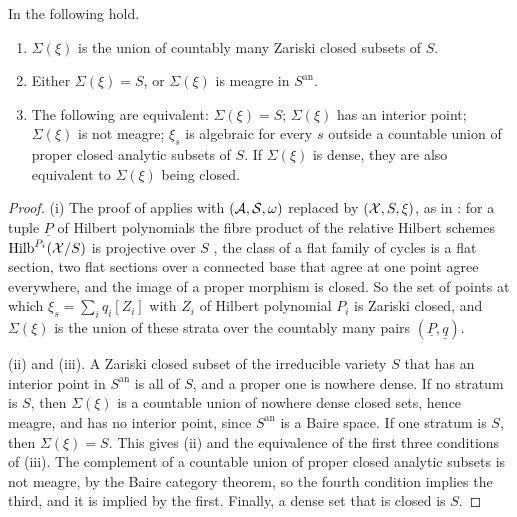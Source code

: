 \begin{lemma}\label{lem:algstrata}
In  the following hold.
\begin{enumerate}[label=\textup{(\roman*)},leftmargin=2.6em,itemsep=2pt]
\item $\Sigma(\xi)$ is the union of countably many Zariski closed subsets of
  $S$.
\item Either $\Sigma(\xi)=S$, or $\Sigma(\xi)$ is meagre in $S^{\mathrm{an}}$.
\item The following are equivalent: $\Sigma(\xi)=S$; $\Sigma(\xi)$ has an
  interior point; $\Sigma(\xi)$ is not meagre; $\xi_{s}$ is algebraic for
  every $s$ outside a countable union of proper closed analytic subsets of
  $S$. If $\Sigma(\xi)$ is dense, they are also equivalent to $\Sigma(\xi)$
  being closed.
\end{enumerate}
\end{lemma}

\begin{proof}
(i) The proof of  applies with
$(\mathcal{A},\mathcal{S},\omega)$ replaced by $(\mathcal{X},S,\xi)$, as in :
for a tuple $\underline{P}$ of Hilbert polynomials the fibre product of the
relative Hilbert schemes $\operatorname{Hilb}^{P_{i}}(\mathcal{X}/S)$ is projective over $S$
\cite{Gro61}, the class of a flat family of cycles is a flat section, two flat
sections over a connected base that agree at one point agree everywhere, and
the image of a proper morphism is closed. So the set of points at which
$\xi_{s}=\sum_{i}q_{i}[Z_{i}]$ with $Z_{i}$ of Hilbert polynomial $P_{i}$ is
Zariski closed, and $\Sigma(\xi)$ is the union of these strata over the
countably many pairs $(\underline{P},\underline{q})$.

(ii) and (iii). A Zariski closed subset of the irreducible variety $S$ that
has an interior point in $S^{\mathrm{an}}$ is all of $S$, and a proper one is
nowhere dense. If no stratum is $S$, then $\Sigma(\xi)$ is a countable union
of nowhere dense closed sets, hence meagre, and has no interior point, since
$S^{\mathrm{an}}$ is a Baire space. If one stratum is $S$, then
$\Sigma(\xi)=S$. This gives (ii) and the equivalence of the first three
conditions of (iii). The complement of a countable union of proper closed
analytic subsets is not meagre, by the Baire category theorem, so the fourth
condition implies the third, and it is implied by the first. Finally, a
dense set that is closed is $S$.
\end{proof}

